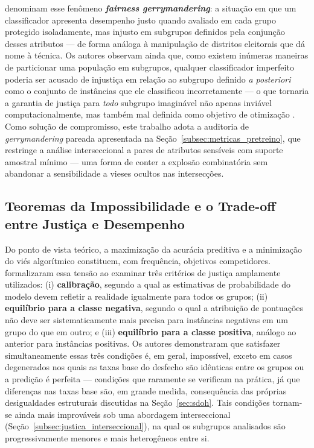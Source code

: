 \citet{kearns2018preventing} denominam esse fenômeno \textbf{\textit{fairness gerrymandering}}: a situação em que um classificador apresenta desempenho justo quando avaliado em cada grupo protegido isoladamente, mas injusto em subgrupos definidos pela conjunção desses atributos — de forma análoga à manipulação de distritos eleitorais que dá nome à técnica. Os autores observam ainda que, como existem inúmeras maneiras de particionar uma população em subgrupos, qualquer classificador imperfeito poderia ser acusado de injustiça em relação ao subgrupo definido \textit{a posteriori} como o conjunto de instâncias que ele classificou incorretamente — o que tornaria a garantia de justiça para \emph{todo} subgrupo imaginável não apenas inviável computacionalmente, mas também mal definida como objetivo de otimização \cite{kearns2018preventing,gohar2023survey}. Como solução de compromisso, este trabalho adota a auditoria de \textit{gerrymandering} pareada apresentada na Seção~\ref{subsec:metricas_pretreino}, que restringe a análise interseccional a pares de atributos sensíveis com suporte amostral mínimo — uma forma de conter a explosão combinatória sem abandonar a sensibilidade a vieses ocultos nas intersecções.

\subsection{Teoremas da Impossibilidade e o Trade-off entre Justiça e Desempenho}\label{subsec:teoremas_impossibilidade}

Do ponto de vista teórico, a maximização da acurácia preditiva e a minimização do viés algorítmico constituem, com frequência, objetivos competidores. \citet{kleinberg2016inherent} formalizaram essa tensão ao examinar três critérios de justiça amplamente utilizados: (i) \textbf{calibração}, segundo a qual as estimativas de probabilidade do modelo devem refletir a realidade igualmente para todos os grupos; (ii) \textbf{equilíbrio para a classe negativa}, segundo o qual a atribuição de pontuações não deve ser sistematicamente mais precisa para instâncias negativas em um grupo do que em outro; e (iii) \textbf{equilíbrio para a classe positiva}, análogo ao anterior para instâncias positivas. Os autores demonstraram que satisfazer simultaneamente essas três condições é, em geral, impossível, exceto em casos degenerados nos quais as taxas base do desfecho são idênticas entre os grupos ou a predição é perfeita — condições que raramente se verificam na prática, já que diferenças nas taxas base são, em grande medida, consequência das próprias desigualdades estruturais discutidas na Seção~\ref{sec:sdoh}. Tais condições tornam-se ainda mais improváveis sob uma abordagem interseccional (Seção~\ref{subsec:justica_interseccional}), na qual os subgrupos analisados são progressivamente menores e mais heterogêneos entre si.

